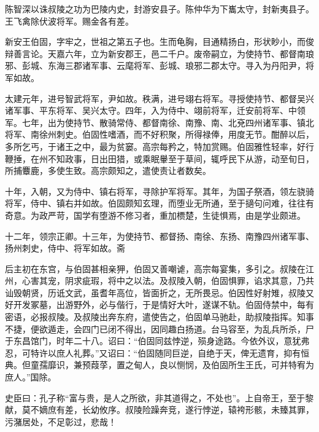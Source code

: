 \documentclass[]{article}
\begin{document}
陈智深以诛叔陵之功为巴陵内史，封游安县子。陈仲华为下巂太守，封新夷县子。王飞禽除伏波将军。赐金各有差。

新安王伯固，字牢之，世祖之第五子也。生而龟胸，目通精扬白，形状眇小，而俊辩善言论。天嘉六年，立为新安郡王，邑二千户。废帝嗣立，为使持节、都督南琅邪、彭城、东海三郡诸军事、云麾将军、彭城、琅邪二郡太守。寻入为丹阳尹，将军如故。

太建元年，进号智武将军，尹如故。秩满，进号翊右将军。寻授使持节、都督吴兴诸军事、平东将军、吴兴太守。四年，入为侍中、翊前将军，迁安前将军、中领军。七年，出为使持节、散骑常侍、都督南徐、南豫、南、北兗四州诸军事、镇北将军、南徐州刺史。伯固性嗜酒，而不好积聚，所得禄俸，用度无节。酣醉以后，多所乞丐，于诸王之中，最为贫窭。高宗每矜之，特加赏赐。伯固雅性轻率，好行鞭捶，在州不知政事，日出田猎，或乘眠轝至于草间，辄呼民下从游，动至旬日，所捕麞鹿，多使生致。高宗颇知之，遣使责让者数矣。

十年，入朝，又为侍中、镇右将军，寻除护军将军。其年，为国子祭酒，领左骁骑将军，侍中、镇右并如故。伯固颇知玄理，而堕业无所通，至于擿句问难，往往有奇意。为政严苛，国学有堕游不修习者，重加槚楚，生徒惧焉，由是学业颇进。

十二年，领宗正卿。十三年，为使持节、都督扬、南徐、东扬、南豫四州诸军事、扬州刺史，侍中、将军如故。斋

后主初在东宫，与伯固甚相亲狎，伯固又善嘲谑，高宗每宴集，多引之。叔陵在江州，心害其宠，阴求疵瑕，将中之以法。及叔陵入朝，伯固惧罪，谄求其意，乃共讪毁朝贤，历诋文武，虽耆年高位，皆面折之，无所畏忌。伯因性好射雉，叔陵又好开发冢墓，出游野外，必与偕行，于是情好大叶，遂谋不轨。伯固侍禁中，每有密语，必报叔陵。及叔陵出奔东府，遣使告之，伯固单马驰赴，助叔陵指挥。知事不捷，便欲遁走，会四门已闭不得出，因同趣白扬道。台马容至，为乱兵所杀，尸于东昌馆门，时年二十八。诏曰：``伯固同兹悖逆，殒身途路。今依外议，意犹弗忍，可特许以庶人礼葬。''又诏曰：``伯固随同巨逆，自绝于天，俾无遗育，抑有恒典。但童孺靡识，兼预葭莩，置之甸人，良以恻悯，及伯固所生王氏，可并特宥为庶人。''国除。

史臣曰：孔子称``富与贵，是人之所欲，非其道得之，不处也''。上自帝王，至于黎献，莫不嫡庶有差，长幼攸序。叔陵险躁奔竞，遂行悖逆，辕袴形骸，未臻其罪，污潴居处，不足彰过，悲哉！
\end{document}
